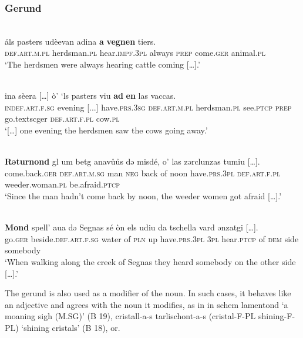 \subsubsection{Gerund}


\ea\label{}
 {\citealt[53]{Büchli1966}}\\
\gll    åls pasters udèevan adina \textbf{a} \textbf{vegnen} tiers.\\
   \textsc{def.art.m.pl} herdsman.\textsc{pl} hear.\textsc{impf.3pl} always \textsc{prep} come.\textsc{ger}  animal.\textsc{pl}\\
\glt `The herdsmen were always hearing cattle coming […].'
\z

\ea\label{}
 {\citealt[28]{Büchli1966}}\\
\gll    ina sèera […] ò’ ‘ls pasters viu \textbf{ad} \textbf{en} las vaccas.\\
     \textsc{indef.art.f.sg} evening [...] have.\textsc{prs.3sg} \textsc{def.art.m.pl} herdsman.\textsc{pl} see.\textsc{ptcp} \textsc{prep} go.textsc{ger} \textsc{def.art.f.pl} cow.\textsc{pl} \\
\glt `[…] one evening the herdsmen saw the cows going away.'
\z

\ea\label{}
 {\citealt[82]{Büchli1966}}\\
\gll   \textbf{Rǝturnond} gl um betg anavůůs dǝ misdé, o’ las zǝrclunzas tumiu […].\\
     come.back.\textsc{ger} \textsc{def.art.m.sg} man \textsc{neg} back of noon have.\textsc{prs.3pl} \textsc{def.art.f.pl} weeder.woman.\textsc{pl} be.afraid.\textsc{ptcp}\\
\glt `Since the man hadn’t come back by noon, the weeder women got afraid […].'
\z

\ea\label{}
 {\citealt[88]{Büchli1966}}\\
\gll    \textbf{Mond} spell’ aua dǝ Segnas sé òn els udiu da tschella vard ǝnzatgi […].\\
     go.\textsc{ger} beside.\textsc{def.art.f.sg} water of  \textsc{pln} up have.\textsc{prs.3pl} \textsc{3pl} hear.\textsc{ptcp} of \textsc{dem} side somebody \\
\glt `When walking along the creek of Segnas they heard somebody on the other side […].'
\z

The gerund is also used as a modifier of the noun. In such cases, it behaves like an adjective and agrees with the noun it modifies, as in in schem lamentond ‘a moaning sigh (M.SG)’ (B 19), cristall-a-s tarlischont-a-s (cristal-F-PL shining-F-PL) ‘shining cristals’ (B 18), or.


